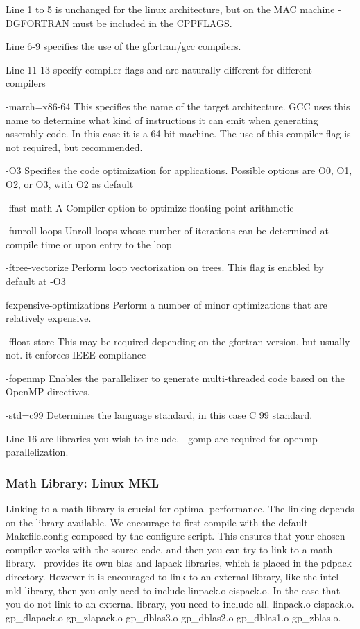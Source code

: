 Line 1 to 5 is unchanged for the linux architecture, but on the MAC machine -DGFORTRAN must be included in the CPPFLAGS. 

Line 6-9 specifies the use of the gfortran/gcc compilers. 

Line 11-13 specify compiler flags and are naturally different for different compilers
\begin{description}
\item{-march=x86-64} This specifies the name of the target architecture. GCC uses this name to determine what kind of instructions it can emit when generating assembly code. In this case it is a 64 bit machine. The use of this compiler flag is not required, but recommended. 
\item{-O3} Specifies the code optimization for applications. Possible options are O0, O1, O2, or O3, with O2 as default
\item{-ffast-math} A Compiler option to optimize floating-point arithmetic 
\item{-funroll-loops} Unroll loops whose number of iterations can be determined at compile time or upon entry to the loop
\item{-ftree-vectorize} Perform loop vectorization on trees. This flag is enabled by default at -O3
\item{fexpensive-optimizations} Perform a number of minor optimizations that are relatively expensive.
\item{-ffloat-store} This may be required depending on the gfortran version, but usually not. it enforces IEEE compliance 
\item{-fopenmp} Enables the parallelizer to generate multi-threaded code based on the OpenMP directives. 
\item{-std=c99} Determines the language standard, in this case C 99 standard. 
  \end{description}
Line 16 are libraries you wish to include. -lgomp are required for openmp parallelization. 

\subsubsection{Math Library: Linux MKL}\label{mkl:ifort2}
Linking to a math library is crucial for optimal performance. The linking 
depends on the library available. We encourage to first compile with the 
default Makefile.config composed by the configure script. This ensures that 
your chosen compiler works with the {\lsdalton} source code,
and then you can try to link to a math library. 
\lsdalton\ provides its own blas and lapack libraries, which is placed in the 
pdpack directory. However it is encouraged to link to an external library, like the intel mkl library, 
then you only need to include linpack.o eispack.o.
In the case that you do not link to an external library, you need to include 
all. linpack.o eispack.o. gp\_dlapack.o 
gp\_zlapack.o gp\_dblas3.o gp\_dblas2.o gp\_dblas1.o gp\_zblas.o.

